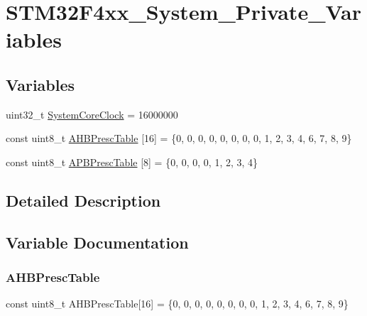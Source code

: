 \hypertarget{group___s_t_m32_f4xx___system___private___variables}{}\section{S\+T\+M32\+F4xx\+\_\+\+System\+\_\+\+Private\+\_\+\+Variables}
\label{group___s_t_m32_f4xx___system___private___variables}
\subsection*{Variables}
\begin{DoxyCompactItemize}
\item 
uint32\+\_\+t \mbox{\hyperlink{group___s_t_m32_f4xx___system___private___variables_gaa3cd3e43291e81e795d642b79b6088e6}{System\+Core\+Clock}} = 16000000
\item 
const uint8\+\_\+t \mbox{\hyperlink{group___s_t_m32_f4xx___system___private___variables_ga6e1d9cd666f0eacbfde31e9932a93466}{A\+H\+B\+Presc\+Table}} \mbox{[}16\mbox{]} = \{0, 0, 0, 0, 0, 0, 0, 0, 1, 2, 3, 4, 6, 7, 8, 9\}
\item 
const uint8\+\_\+t \mbox{\hyperlink{group___s_t_m32_f4xx___system___private___variables_ga5b4f8b768465842cf854a8f993b375e9}{A\+P\+B\+Presc\+Table}} \mbox{[}8\mbox{]} = \{0, 0, 0, 0, 1, 2, 3, 4\}
\end{DoxyCompactItemize}


\subsection{Detailed Description}


\subsection{Variable Documentation}
\mbox{\label{group___s_t_m32_f4xx___system___private___variables_ga6e1d9cd666f0eacbfde31e9932a93466}} 
\subsubsection{\texorpdfstring{A\+H\+B\+Presc\+Table}{AHBPrescTable}}
{\footnotesize\ttfamily const uint8\+\_\+t A\+H\+B\+Presc\+Table\mbox{[}16\mbox{]} = \{0, 0, 0, 0, 0, 0, 0, 0, 1, 2, 3, 4, 6, 7, 8, 9\}}

